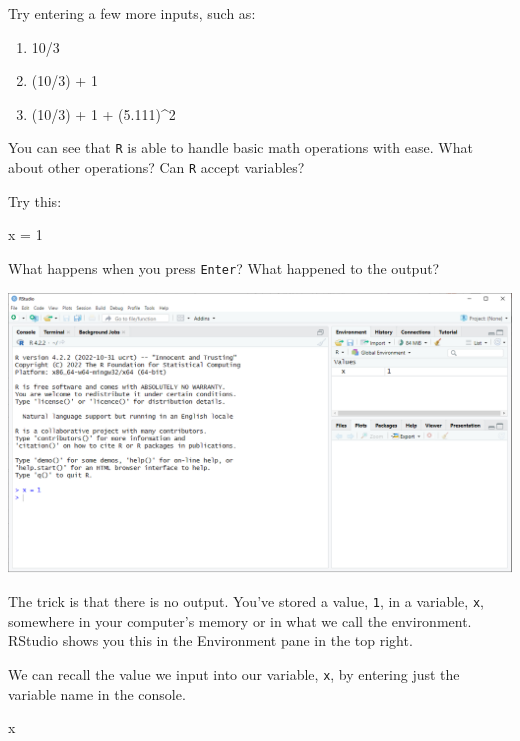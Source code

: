 \documentclass[
]{book}
\newenvironment{Shaded}{\begin{snugshade}}{\end{snugshade}}
\newcommand{\DecValTok}[1]{\textcolor[rgb]{0.00,0.00,0.81}{#1}}
\newcommand{\NormalTok}[1]{#1}
\newcommand{\OtherTok}[1]{\textcolor[rgb]{0.56,0.35,0.01}{#1}}
\begin{document}
Try entering a few more inputs, such as:

\begin{enumerate}
\def\labelenumi{\arabic{enumi}.}
\item
  10/3
\item
  (10/3) + 1
\item
  (10/3) + 1 + (5.111)\^{}2
\end{enumerate}

You can see that \texttt{R} is able to handle basic math operations with ease. What about other operations? Can \texttt{R} accept variables?

Try this:

\begin{Shaded}
\begin{Highlighting}[]
\NormalTok{x }\OtherTok{=} \DecValTok{1}
\end{Highlighting}
\end{Shaded}

What happens when you press \texttt{Enter}? What happened to the output?

\includegraphics{docs/_main_files/figure-html/RStudio console_x1.png}

The trick is that there is no output. You've stored a value, \texttt{1}, in a variable, \texttt{x}, somewhere in your computer's memory or in what we call the environment. RStudio shows you this in the Environment pane in the top right.

We can recall the value we input into our variable, \texttt{x}, by entering just the variable name in the console.

\begin{Shaded}
\begin{Highlighting}[]
\NormalTok{x}
\end{Highlighting}
\end{Shaded}
\end{document}
